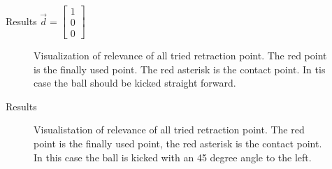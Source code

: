 \documentclass{beamer}
\begin{document}
\begin{frame}{Results}
\footnotesize{ $\vec{d} = \begin{bmatrix} 1\\ 0 \\ 0  \end{bmatrix}$}
\begin{figure}[htbp]
  \centering
  \caption{Visualization of relevance of all tried retraction point. The red
      point is the finally used point. The red asterisk is the contact point. In
      tis case the ball should be kicked straight forward.
         }
  \label{fig:retraction_plot1}
\end{figure}
\end{frame}

\begin{frame}{Results}
\begin{figure}[htbp]
  \centering
  \caption{Visualistation of relevance of all tried retraction point. The red
      point is the finally used point, the red asterisk is the contact point. 
      In this case the ball is kicked with an 45 degree angle to the left.
         }
  \label{fig:retraction_plot2}
\end{figure}
\end{frame}
\end{document}
